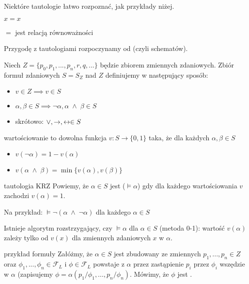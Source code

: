 Niektóre tautologie łatwo rozpoznać, jak przykłady niżej.
\begin{example}[m]
  \item $x=x$
  \item $=$ jest relacją równoważności
\end{example}

Przygodę z tautologiami rozpoczynamy od  (czyli schematów).

Niech $Z=\{p_0, p_1,...,p_n, r, q,...\}$ będzie zbiorem zmiennych zdaniowych. Zbiór formuł zdaniowych $S=S_Z$ nad $Z$ definiujemy w następujący sposób:
\begin{itemize}
  \item $v\in Z\implies v\in S$
  \item $\alpha, \beta\in S\implies \neg\alpha, \alpha\;\land\;\beta\in S$
  \item skrótowo: $\lor, \to, \leftrightarrow\in S$
\end{itemize}

\begin{definition}{wartościowanie}{}
   to dowolna funkcja $v:S\to \{0,1\}$ taka, że dla każdych $\alpha,\beta\in S$ 
  \begin{itemize}
    \item $v(\neg\alpha)=1-v(\alpha)$
    \item $v(\alpha\;\land\;\beta)=\min\{v(\alpha), v(\beta)\}$
  \end{itemize}
\end{definition}

\begin{definition}{tautologia KRZ}{}
  Powiemy, że $\alpha\in S$ jest  ($\models\alpha$) gdy dla każdego wartościowania $v$ zachodzi $v(\alpha)=1$.
\end{definition}

Na przykład: $\models\neg(\alpha\;\land\;\neg\alpha)$ dla każdego $\alpha\in S$

Istnieje algorytm rozstrzygający, czy $\models \alpha$ dla $\alpha\in S$ (metoda 0-1): wartość $v(\alpha)$ zależy tylko od $v(x)$ dla zmiennych zdaniowych $x$ w $\alpha$.

\begin{definition}{przykład formuły}{}
  Załóżmy, że $\alpha\in S$ jest zbudowany ze zmiennych $p_1,..., p_n\in Z$ oraz $\phi_1,..., \phi_n\in\mathcal{F}_L$ i $\phi\in\mathcal{F}_L$ powstaje z $\alpha$ przez zastąpienie $p_i$ przez $\phi_i$ wszędzie w $\alpha$ (zapisujemy $\phi=\alpha(p_1/\phi_1,...,p_n/\phi_n)$. Mówimy, że $\phi$ jest . 
\end{definition}

